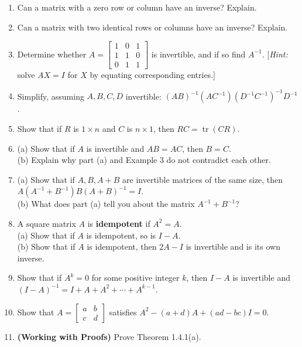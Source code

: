 \documentclass{article}
\theoremstyle{mystyle}
\begin{document}
\begin{enumerate}
    \item[35.] Can a matrix with a zero row or column have an inverse? Explain.

    \item[36.] Can a matrix with two identical rows or columns have an inverse? Explain.

    \item[37.] Determine whether $A=\begin{bmatrix}1&0&1\\1&1&0\\0&1&1\end{bmatrix}$ is invertible, and if so find $A^{-1}$. [\emph{Hint:} solve $AX=I$ for $X$ by equating corresponding entries.]

    \item[39.] Simplify, assuming $A,B,C,D$ invertible: $(AB)^{-1}(AC^{-1})(D^{-1}C^{-1})^{-1}D^{-1}$.

    \item[41.] Show that if $R$ is $1\times n$ and $C$ is $n\times1$, then $RC=\operatorname{tr}(CR)$.

    \item[43.] (a) Show that if $A$ is invertible and $AB=AC$, then $B=C$.\\
    (b) Explain why part (a) and Example 3 do not contradict each other.

    \item[45.] (a) Show that if $A,B,A+B$ are invertible matrices of the same size, then $A(A^{-1}+B^{-1})B(A+B)^{-1}=I$.\\
    (b) What does part (a) tell you about the matrix $A^{-1}+B^{-1}$?

    \item[46.] A square matrix $A$ is \textbf{idempotent} if $A^2=A$.\\
    (a) Show that if $A$ is idempotent, so is $I-A$.\\
    (b) Show that if $A$ is idempotent, then $2A-I$ is invertible and is its own inverse.

    \item[47.] Show that if $A^k=0$ for some positive integer $k$, then $I-A$ is invertible and $(I-A)^{-1}=I+A+A^2+\cdots+A^{k-1}$.

    \item[48.] Show that $A=\begin{bmatrix}a&b\\c&d\end{bmatrix}$ satisfies $A^2-(a+d)A+(ad-bc)I=0$.

    \item[51.] \textbf{(Working with Proofs)} Prove Theorem 1.4.1(a).
\end{enumerate}
\end{document}

